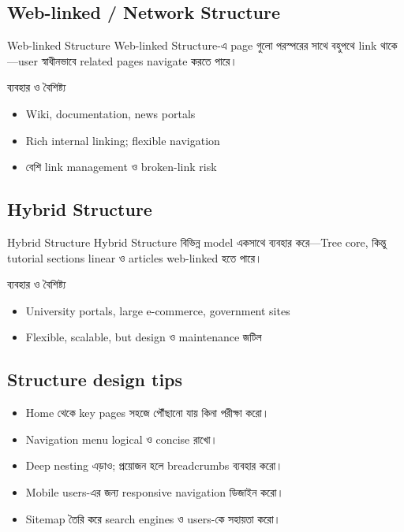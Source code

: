 \subsection{Web-linked / Network Structure}
\begin{definitionbox}{Web-linked Structure}
Web-linked Structure-এ page গুলো পরস্পরের সাথে বহুপথে link থাকে—user স্বাধীনভাবে related pages navigate করতে পারে।\end{definitionbox}

\begin{keypointbox}{ব্যবহার ও বৈশিষ্ট্য}
\begin{itemize}
\item Wiki, documentation, news portals
\item Rich internal linking; flexible navigation
\item বেশি link management ও broken-link risk
\end{itemize}
\end{keypointbox}

\subsection{Hybrid Structure}
\begin{definitionbox}{Hybrid Structure}
Hybrid Structure বিভিন্ন model একসাথে ব্যবহার করে—Tree core, কিন্তু tutorial sections linear ও articles web-linked হতে পারে।\end{definitionbox}

\begin{keypointbox}{ব্যবহার ও বৈশিষ্ট্য}
\begin{itemize}
\item University portals, large e-commerce, government sites
\item Flexible, scalable, but design ও maintenance জটিল
\end{itemize}
\end{keypointbox}

\subsection{Structure design tips}
\begin{itemize}
\item Home থেকে key pages সহজে পৌঁছানো যায় কিনা পরীক্ষা করো।
\item Navigation menu logical ও concise রাখো।
\item Deep nesting এড়াও; প্রয়োজন হলে breadcrumbs ব্যবহার করো।
\item Mobile users-এর জন্য responsive navigation ডিজাইন করো।
\item Sitemap তৈরি করে search engines ও users-কে সহায়তা করো।
\end{itemize}

